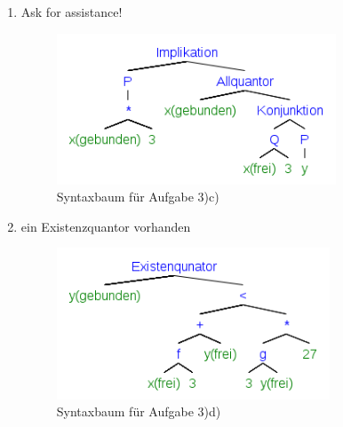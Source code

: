 \documentclass[a4paper]{article}
\begin{document}
\begin{enumerate}
\begin{enumerate}
			\item Ask for assistance!
			\begin{figure}[ht!]
				\begin{center}
					\includegraphics[height=45mm]{2c.png}
					\caption{Syntaxbaum für Aufgabe 3)c)}
				\end{center}
			\end{figure}
			\clearpage			
			
			\item ein Existenzquantor vorhanden
			\begin{figure}[ht!]
				\begin{center}
					\includegraphics[height=45mm]{2d.png}
					\caption{Syntaxbaum für Aufgabe 3)d)}
				\end{center}
			\end{figure}
		\end{enumerate}
	\end{enumerate}
\end{document}
